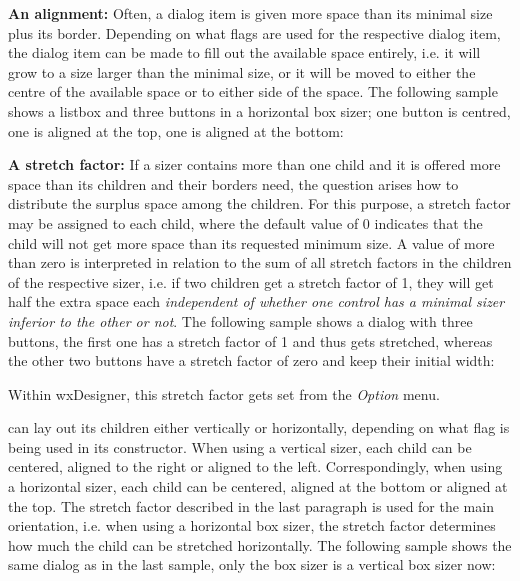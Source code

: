 
{\bf An alignment:} Often, a dialog item is given more space than its minimal size
plus its border. Depending on what flags are used for the respective dialog
item, the dialog item can be made to fill out the available space entirely, i.e.
it will grow to a size larger than the minimal size, or it will be moved to either
the centre of the available space or to either side of the space. The following
sample shows a listbox and three buttons in a horizontal box sizer; one button
is centred, one is aligned at the top, one is aligned at the bottom:


{\bf A stretch factor:} If a sizer contains more than one child and it is offered
more space than its children and their borders need, the question arises how to
distribute the surplus space among the children. For this purpose, a stretch
factor may be assigned to each child, where the default value of 0 indicates that the child
will not get more space than its requested minimum size. A value of more than zero
is interpreted in relation to the sum of all stretch factors in the children
of the respective sizer, i.e. if two children get a stretch factor of 1, they will
get half the extra space each {\it independent of whether one control has a minimal
sizer inferior to the other or not}. The following sample shows a dialog with
three buttons, the first one has a stretch factor of 1 and thus gets stretched,
whereas the other two buttons have a stretch factor of zero and keep their
initial width:


Within wxDesigner, this stretch factor gets set from the {\it Option} menu.


 can lay out its children either vertically
or horizontally, depending on what flag is being used in its constructor.
When using a vertical sizer, each child can be centered, aligned to the
right or aligned to the left. Correspondingly, when using a horizontal
sizer, each child can be centered, aligned at the bottom or aligned at
the top. The stretch factor described in the last paragraph is used
for the main orientation, i.e. when using a horizontal box sizer, the
stretch factor determines how much the child can be stretched horizontally.
The following sample shows the same dialog as in the last sample,
only the box sizer is a vertical box sizer now:

